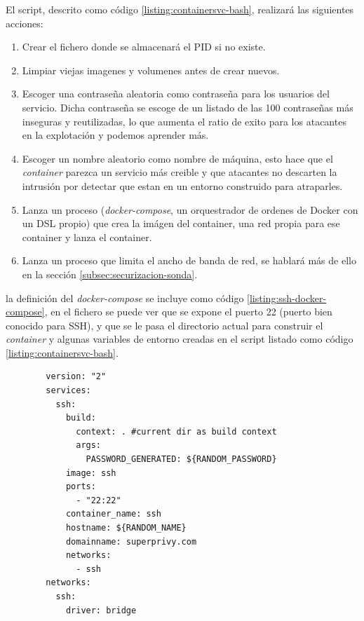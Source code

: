     
El script, descrito como código \ref{listing:containersvc-bash}, realizará las siguientes acciones:

\begin{enumerate}
    \item Crear el fichero donde se almacenará el PID si no existe.
    \item Limpiar viejas imagenes y volumenes antes de crear nuevos.
    \item Escoger una contraseña aleatoria como contraseña para los usuarios del servicio. Dicha
    contraseña se escoge de un listado de las 100 contraseñas más inseguras y reutilizadas, lo que aumenta
    el ratio de exito para los atacantes en la explotación y podemos aprender más.
    \item Escoger un nombre aleatorio como nombre de máquina, esto hace que el \emph{container} parezca un servicio
    más creible y que atacantes no descarten la intrusión por detectar que estan en un entorno construido para atraparles.
    \item Lanza un proceso (\emph{docker-compose}, un orquestrador de ordenes de Docker con un DSL propio) que crea la imágen del container, una red propia para ese container y lanza el container. 
    \item Lanza un proceso que limita el ancho de banda de red, se hablará más de ello en la sección \ref{subsec:securizacion-sonda}.
\end{enumerate}

la definición del \emph{docker-compose} se incluye como código \ref{listing:ssh-docker-compose}, en el fichero se puede ver que se expone el puerto
22 (puerto bien conocido para SSH), y que se le pasa el directorio actual para construir el \emph{container} y algunas variables de entorno 
creadas en el script listado como código \ref{listing:containersvc-bash}.

    \begin{verbatim}
        version: "2"
        services:
          ssh:
            build:
              context: . #current dir as build context
              args:
                PASSWORD_GENERATED: ${RANDOM_PASSWORD}
            image: ssh
            ports:
              - "22:22"
            container_name: ssh
            hostname: ${RANDOM_NAME}
            domainname: superprivy.com
            networks:
              - ssh
        networks:
          ssh:
            driver: bridge
    \end{verbatim}

